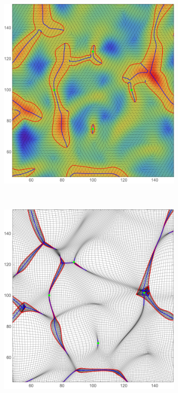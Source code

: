 \documentclass[a4paper, 11pt]{article}
\begin{document}
\begin{figure}
\begin{subfigure}[b]{0.31\textwidth}
\end{subfigure}
\caption{Rotation of the cusp caustic. \textit{Upper:} the eigenvalue and eigenvector fields in Lagrangian space. \textit{Lower:} the Zel'dovich approximation in Eulerian space. \textit{Left:} with the vertical orientation. \textit{Center:} with a diagonal orientation. \textit{Right:} with the horizontal orientation.}\label{fig:rotation}
\centering
\begin{subfigure}[b]{0.46\textwidth}
\includegraphics[width=\textwidth]{Composite_L}
\end{subfigure}~
\begin{subfigure}[b]{0.46\textwidth}
\includegraphics[width=\textwidth]{Composite_Z}

\end{subfigure}
\end{figure}
\end{document}
